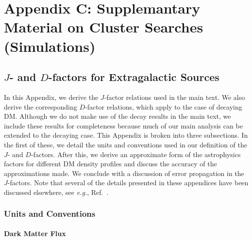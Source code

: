 \chapter{Appendix C: Supplemantary Material on Cluster Searches (Simulations)}

\section{$J$- and $D$-factors for Extragalactic Sources}
\label{app:JDrelations}

In this Appendix, we derive the $J$-factor relations used in the main text. We also derive the corresponding $D$-factor relations, which apply to the case of decaying DM.  Although we do not make use of the decay results in the main text, we include these results for completeness because much of our main analysis can be extended to the decaying case.
This Appendix is broken into three subsections. In the first of these, we detail the units and conventions used in our definition of the $J$- and $D$-factors.  After this, we derive an approximate form of the astrophysics factors for different DM density profiles and discuss the accuracy of the approximations made.  We conclude with a discussion of error propagation in the $J$-factors.  Note that several of the details presented in these appendices have been discussed elsewhere, see \emph{e.g.}, Ref.~\cite{Abdo:2010ex,Charbonnier:2011ft,Charbonnier:2012gf,Evans:2016xwx}. 

\subsection{Units and Conventions}

\subsubsection{Dark Matter Flux}

